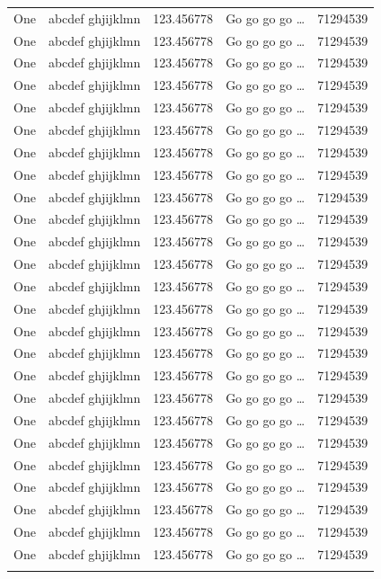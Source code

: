 \documentclass[phd]{ndsu-thesis-2022}
\begin{document}
\begin{longtable}{l l l l r}
One & abcdef ghjijklmn & 123.456778  & Go go go go \ldots & \num{71294539}\\
One & abcdef ghjijklmn & 123.456778  & Go go go go \ldots & \num{71294539}\\
One & abcdef ghjijklmn & 123.456778  & Go go go go \ldots & \num{71294539}\\
One & abcdef ghjijklmn & 123.456778  & Go go go go \ldots & \num{71294539}\\
One & abcdef ghjijklmn & 123.456778  & Go go go go \ldots & \num{71294539}\\
One & abcdef ghjijklmn & 123.456778  & Go go go go \ldots & \num{71294539}\\
One & abcdef ghjijklmn & 123.456778  & Go go go go \ldots & \num{71294539}\\
One & abcdef ghjijklmn & 123.456778  & Go go go go \ldots & \num{71294539}\\
One & abcdef ghjijklmn & 123.456778  & Go go go go \ldots & \num{71294539}\\
One & abcdef ghjijklmn & 123.456778  & Go go go go \ldots & \num{71294539}\\
One & abcdef ghjijklmn & 123.456778  & Go go go go \ldots & \num{71294539}\\
One & abcdef ghjijklmn & 123.456778  & Go go go go \ldots & \num{71294539}\\
One & abcdef ghjijklmn & 123.456778  & Go go go go \ldots & \num{71294539}\\
One & abcdef ghjijklmn & 123.456778  & Go go go go \ldots & \num{71294539}\\
One & abcdef ghjijklmn & 123.456778  & Go go go go \ldots & \num{71294539}\\
One & abcdef ghjijklmn & 123.456778  & Go go go go \ldots & \num{71294539}\\
One & abcdef ghjijklmn & 123.456778  & Go go go go \ldots & \num{71294539}\\
One & abcdef ghjijklmn & 123.456778  & Go go go go \ldots & \num{71294539}\\
One & abcdef ghjijklmn & 123.456778  & Go go go go \ldots & \num{71294539}\\
One & abcdef ghjijklmn & 123.456778  & Go go go go \ldots & \num{71294539}\\
One & abcdef ghjijklmn & 123.456778  & Go go go go \ldots & \num{71294539}\\
One & abcdef ghjijklmn & 123.456778  & Go go go go \ldots & \num{71294539}\\
One & abcdef ghjijklmn & 123.456778  & Go go go go \ldots & \num{71294539}\\
One & abcdef ghjijklmn & 123.456778  & Go go go go \ldots & \num{71294539}\\
One & abcdef ghjijklmn & 123.456778  & Go go go go \ldots & \num{71294539}\\
\bottomrule
\label{lt:sim}
\end{longtable}
\endgroup
\end{document}
